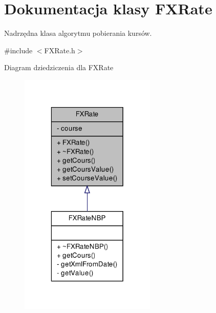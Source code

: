 \hypertarget{class_f_x_rate}{\section{\-Dokumentacja klasy \-F\-X\-Rate}
\label{class_f_x_rate}
}


\-Nadrzędna klasa algorytmu pobierania kursów.  




{\ttfamily \#include $<$\-F\-X\-Rate.\-h$>$}



\-Diagram dziedziczenia dla \-F\-X\-Rate\nopagebreak
\begin{figure}[H]
\begin{center}
\leavevmode
\includegraphics[width=184pt]{class_f_x_rate__inherit__graph}
\end{center}
\end{figure}
